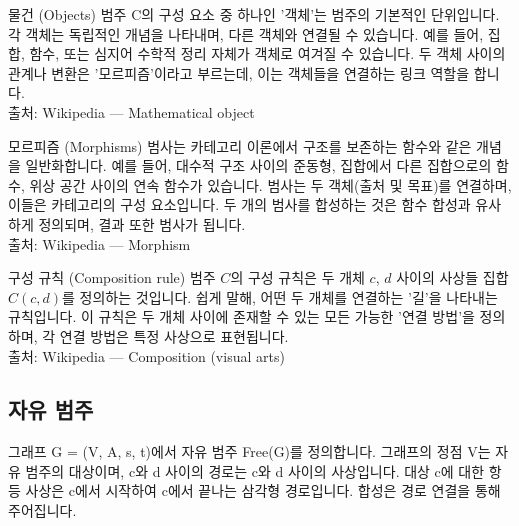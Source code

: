 \documentclass[11pt, a4paper, twoside, openany]{book}
\begin{document}
{\begin{deepresearch}{물건 (Objects)}
범주 C\hspace{0pt}의 구성 요소 중 하나인 '객체'는 범주의 기본적인 단위입니다.  각 객체는 독립적인 개념을 나타내며, 다른 객체와 연결될 수 있습니다. 예를 들어, 집합, 함수, 또는 심지어 수학적 정리 자체가 객체로 여겨질 수 있습니다.  두 객체 사이의 관계나 변환은 '모르피즘'이라고 부르는데, 이는 객체들을 연결하는 링크 역할을 합니다.
\\[4pt]{\footnotesize\color{ctgray} 출처: Wikipedia — Mathematical object}
\end{deepresearch}

\begin{deepresearch}{모르피즘 (Morphisms)}
범사는 카테고리 이론에서 구조를 보존하는 함수와 같은 개념을 일반화합니다. 예를 들어, 대수적 구조 사이의 준동형, 집합에서 다른 집합으로의 함수, 위상 공간 사이의 연속 함수가 있습니다. 범사는 두 객체(출처 및 목표)를 연결하며, 이들은 카테고리의 구성 요소입니다.  두 개의 범사를 합성하는 것은 함수 합성과 유사하게 정의되며, 결과 또한 범사가 됩니다.
\\[4pt]{\footnotesize\color{ctgray} 출처: Wikipedia — Morphism}
\end{deepresearch}

\begin{deepresearch}{구성 규칙 (Composition rule)}
범주 $C$의 구성 규칙은 두 개체 $c$, $d$ 사이의 사상들 집합 $C(c, d)$를 정의하는 것입니다.  쉽게 말해, 어떤 두 개체를 연결하는 '길'을 나타내는 규칙입니다. 이 규칙은 두 개체 사이에 존재할 수 있는 모든 가능한 '연결 방법'을 정의하며, 각 연결 방법은 특정 사상으로 표현됩니다.
\\[4pt]{\footnotesize\color{ctgray} 출처: Wikipedia — Composition (visual arts)}
\end{deepresearch}


\subsection{자유 범주}
\label{sec:3-2-1}

그래프 G = (V, A, s, t)에서 자유 범주 Free(G)를 정의합니다. 그래프의 정점 V\hspace{0pt}는 자유 범주의 대상이며, c\hspace{0pt}와 d 사이의 경로는 c\hspace{0pt}와 d 사이의 사상입니다. 대상 c\hspace{0pt}에 대한 항등 사상은 c\hspace{0pt}에서 시작하여 c\hspace{0pt}에서 끝나는 삼각형 경로입니다. 합성은 경로 연결을 통해 주어집니다.

}
\end{document}
